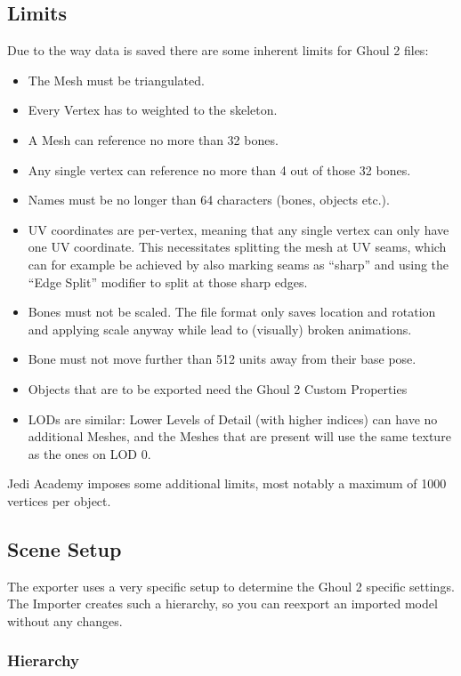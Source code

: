\documentclass[a4paper,10pt]{article}
\begin{document}
 
 \subsection{Limits}
 
 Due to the way data is saved there are some inherent limits for Ghoul 2 files:
 \begin{itemize}
  \item The Mesh must be triangulated.
  \item Every Vertex has to weighted to the skeleton.
  \item A Mesh can reference no more than 32 bones.
  \item Any single vertex can reference no more than 4 out of those 32 bones.
  \item Names must be no longer than 64 characters (bones, objects etc.).
  \item UV coordinates are per-vertex, meaning that any single vertex can only have one UV coordinate. This
  necessitates splitting the mesh at UV seams, which can for example be achieved by also marking seams as
  ``sharp'' and using the ``Edge Split'' modifier to split at those sharp edges.
  \item Bones must not be scaled. The file format only saves location and rotation and applying scale anyway
  while lead to (visually) broken animations.
  \item Bone must not move further than 512 units away from their base pose.
  \item Objects that are to be exported need the Ghoul 2 Custom Properties
  \item LODs are similar: Lower Levels of Detail (with higher indices) can have no additional Meshes, and the
  Meshes that are present will use the same texture as the ones on LOD 0.
 \end{itemize}
 Jedi Academy imposes some additional limits, most notably a maximum of 1000 vertices per object.
 
 \subsection{Scene Setup}
 
 The exporter uses a very specific setup to determine the Ghoul 2 specific settings. The Importer creates
 such a hierarchy, so you can reexport an imported model without any changes.
 
 \subsubsection{Hierarchy}
 
\end{document}
